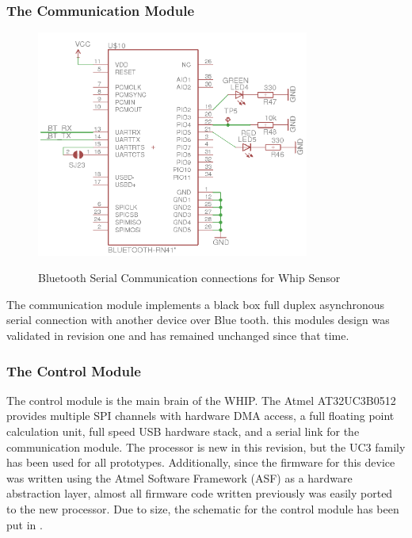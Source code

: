 \subsubsection{The Communication Module}
\begin{figure}
	\begin{center}
		\label{fig:Rev5_BT}
		\includegraphics[scale=1,width=0.8\textwidth]{Images/Rev5_BT.png} 
		\caption{Bluetooth Serial Communication connections for Whip Sensor}
	\end{center}
\end{figure}
The communication module implements a black box full duplex asynchronous serial connection with another device over Blue tooth. this modules design was validated in revision one and has remained unchanged since that time. 

\subsubsection{The Control Module}
The control module is the main brain of the WHIP. The Atmel AT32UC3B0512 provides multiple SPI channels with hardware DMA access, a full floating point calculation unit, full speed USB hardware stack, and a serial link for the communication module.\cite{AT32UC3B} The processor is new in this revision, but the UC3 family has been used for all prototypes. Additionally, since the firmware for this device was written using the Atmel Software Framework (ASF) as a hardware abstraction layer, almost all firmware code written previously was easily ported to the new processor. Due to size, the schematic for the control module has been put in .

